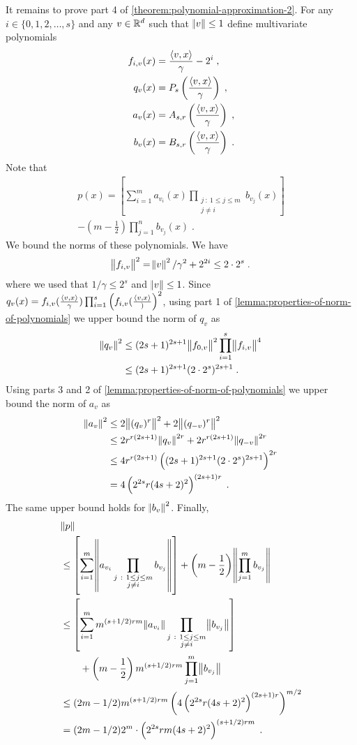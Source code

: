 It remains to prove part 4 of \autoref{theorem:polynomial-approximation-2}.
For any $i \in \{0,1,2,\dots,s\}$ and any $v \in \mathbb{R}^d$ such that $\norm{v} \le 1$
define multivariate polynomials
\begin{align*}
f_{i,v}(x) & = \frac{\left\langle v, x \right\rangle}{\gamma} - 2^i \; , \\
q_v(x) & = P_s \left( \frac{\left\langle v, x \right\rangle}{\gamma} \right) \; , \\
a_v(x) & = A_{s,r} \left( \frac{\left\langle v, x \right\rangle}{\gamma} \right) \; , \\
b_v(x) & = B_{s,r} \left( \frac{\left\langle v, x \right\rangle}{\gamma} \right) \; .
\end{align*}
Note that
\begin{multline*}
p(x) = \left[ \sum_{i=1}^m a_{v_i}(x) \prod_{\substack{j ~:~ 1 \le j \le m \\ j \neq i}} b_{v_j}(x) \right]  \\
- \left(m - \frac{1}{2} \right) \prod_{j=1}^n b_{v_j}(x) \; .
\end{multline*}
We bound the norms of these polynomials. We have
$$
\norm{f_{i,v}}^2 = \norm{v}^2/\gamma^2 + 2^{2i} \le 2 \cdot 2^s \; .
$$
where we used that $1/\gamma \le 2^s$ and $\norm{v} \le 1$.
Since $q_v(x) = f_{i,v}(\frac{\left\langle v, x \right\rangle}{\gamma}) \prod_{i=1}^s \left(f_{i,v}(\frac{\left\langle v, x \right\rangle})\right)^2$,
using part 1 of \autoref{lemma:properties-of-norm-of-polynomials} we upper bound the norm of $q_v$
as
\begin{align*}
\norm{q_v}^2
& \le (2s+1)^{2s+1} \norm{f_{0,v}}^2 \prod_{i=1}^s \norm{f_{i,v}}^4 \\
& \le  (2s+1)^{2s+1} (2 \cdot 2^s)^{2s + 1} \; .
\end{align*}
Using parts 3 and 2 of \autoref{lemma:properties-of-norm-of-polynomials} we upper bound the norm of $a_v$ as
\begin{align*}
\norm{a_v}^2
& \le 2\norm{(q_v)^r}^2 + 2\norm{(q_{-v})^r}^2 \\
& \le 2 r^{r(2s+1)} \norm{q_v}^{2r} + 2 r^{r(2s+1)} \norm{q_{-v}}^{2r} \\
& \le 4 r^{r(2s+1)} \left((2s+1)^{2s+1} (2 \cdot 2^s)^{2s + 1} \right)^{2r} \\
& = 4 \left(2^{2s} r (4s+2)^2 \right)^{(2s+1)r} \; .
\end{align*}
The same upper bound holds for $\norm{b_v}^2$. Finally,
\begin{align*}
& \norm{p} \\
& \le \left[ \sum_{i=1}^m \norm{a_{v_i} \prod_{\substack{j ~:~ 1 \le j \le m \\ j \neq i}} b_{v_j}} \right] + \left(m - \frac{1}{2} \right) \norm{\prod_{j=1}^m b_{v_j}} \\
& \le \left[ \sum_{i=1}^m m^{(s+1/2)rm} \norm{a_{v_i}} \prod_{\substack{j ~:~ 1 \le j \le m \\ j \neq i}} \norm{b_{v_j}} \right] \\
& \qquad + \left(m - \frac{1}{2} \right) m^{(s+1/2)rm} \prod_{j=1}^m \norm{b_{v_j}} \\
& \le (2m-1/2) m^{(s+1/2)rm} \left(4 \left(2^{2s} r (4s+2)^2 \right)^{(2s+1)r} \right)^{m/2} \\
& = (2m-1/2) 2^m \cdot \left(2^{2s} rm (4s+2)^2 \right)^{(s+1/2)rm} \; .
\end{align*}
